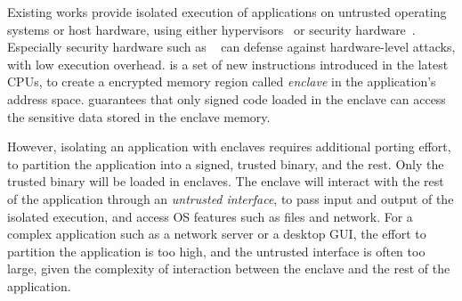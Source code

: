 {%

Existing works provide isolated execution of applications
on untrusted operating systems or host hardware,
using either hypervisors~\citep{criswell2014virtualghost, flicker, inktag, zhang2012mushi} or security hardware~\citep{intelsgx, secureblue++}.
Especially security hardware such as \intel{} \sgx{}~\citep{intelsgx} can defense against hardware-level attacks,
with low execution overhead.
\sgx{} is a set of new instructions introduced in the latest \intel{} CPUs,
to create a encrypted memory region called {\it enclave}
in the application's address space.
\sgx{} guarantees that only signed code loaded in the enclave can access the sensitive data stored in the enclave memory.


However, isolating an application with \sgx{} enclaves
requires additional porting effort,
to partition the application into a signed, trusted binary,
and the rest.
Only the trusted binary will be loaded in enclaves.
The enclave will interact with the rest of the application
through an {\em untrusted interface},
to pass input and output of the isolated execution,
and access OS features such as files and network.
For a complex application such as a network server or a desktop GUI,
the effort to partition the application is too high,
and the untrusted interface is often too large,
given the complexity of interaction between the enclave and the rest of the application.


}
